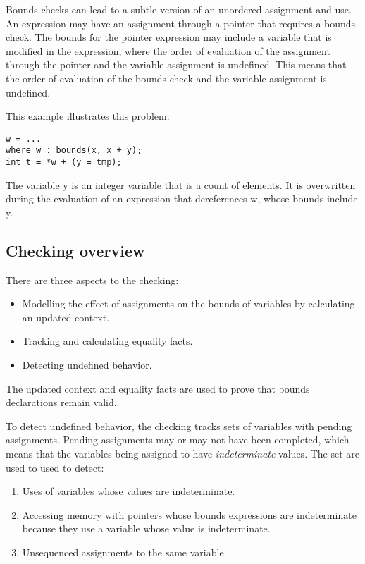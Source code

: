 Bounds checks can lead to a subtle version of an unordered assignment
and use.  An expression may have an assignment through a pointer that requires a
bounds check. The bounds for the pointer expression may include a
variable that is modified in the expression, where the order of
evaluation of the assignment through the pointer and the variable
assignment is undefined. This means that the order of evaluation of the
bounds check and the variable assignment is undefined.

This example illustrates this problem:

\begin{lstlisting}
w = ...
where w : bounds(x, x + y);
int t = *w + (y = tmp);
\end{lstlisting}

The variable y is an integer variable that is a count of elements. It is
overwritten during the evaluation of an expression that dereferences w,
whose bounds include y.

\subsection{Checking overview}
There are three aspects to the checking:
\begin{itemize}
\item Modelling the effect of assignments on the bounds
of variables by calculating an updated context.
\item Tracking and calculating equality facts.
\item Detecting undefined behavior.
\end{itemize}
The updated context and equality facts are used to prove that bounds
declarations remain valid. 

To detect undefined behavior, the checking tracks
sets of variables with pending assignments.  Pending
assignments may or may not have been completed, which means
that the variables being assigned to have {\em indeterminate}
values.  The set are used to used to detect:
\begin{enumerate}
\item Uses of variables whose values are indeterminate.
\item Accessing memory with pointers whose bounds expressions
are indeterminate because they use a variable whose value is indeterminate.
\item Unsequenced assignments to the  same variable.
\end{enumerate}

